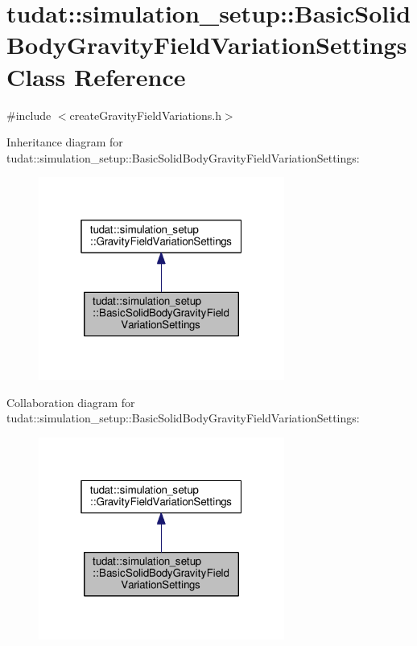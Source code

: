 \hypertarget{classtudat_1_1simulation__setup_1_1BasicSolidBodyGravityFieldVariationSettings}{}\section{tudat\+:\+:simulation\+\_\+setup\+:\+:Basic\+Solid\+Body\+Gravity\+Field\+Variation\+Settings Class Reference}
\label{classtudat_1_1simulation__setup_1_1BasicSolidBodyGravityFieldVariationSettings}


{\ttfamily \#include $<$create\+Gravity\+Field\+Variations.\+h$>$}



Inheritance diagram for tudat\+:\+:simulation\+\_\+setup\+:\+:Basic\+Solid\+Body\+Gravity\+Field\+Variation\+Settings\+:
\nopagebreak
\begin{figure}[H]
\begin{center}
\leavevmode
\includegraphics[width=229pt]{classtudat_1_1simulation__setup_1_1BasicSolidBodyGravityFieldVariationSettings__inherit__graph}
\end{center}
\end{figure}


Collaboration diagram for tudat\+:\+:simulation\+\_\+setup\+:\+:Basic\+Solid\+Body\+Gravity\+Field\+Variation\+Settings\+:
\nopagebreak
\begin{figure}[H]
\begin{center}
\leavevmode
\includegraphics[width=229pt]{classtudat_1_1simulation__setup_1_1BasicSolidBodyGravityFieldVariationSettings__coll__graph}
\end{center}
\end{figure}
